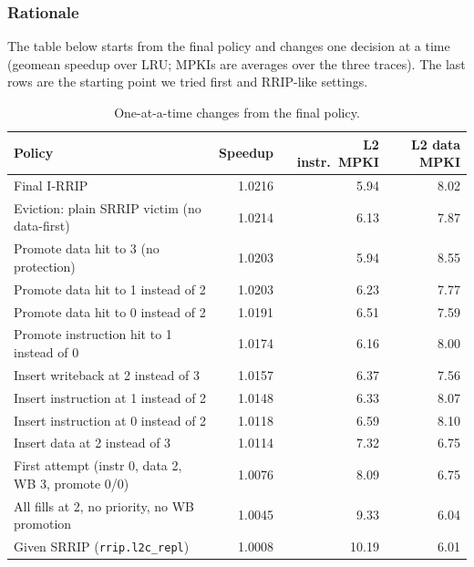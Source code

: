 \documentclass[11pt,a4paper]{article}
\begin{document}
\subsubsection{Rationale}

The table below starts from the final policy and changes one decision at a time (geomean speedup
over LRU; MPKIs are averages over the three traces). The last rows are the starting point we
tried first and RRIP-like settings.

\begin{table}[H]
    \centering
    \begin{tabular}{lrrr}
        \toprule
        Policy & Speedup & L2 instr.\ MPKI & L2 data MPKI \\
        \midrule
        Final I-RRIP                                 & 1.0216 & 5.94  & 8.02 \\
        \midrule
        Eviction: plain SRRIP victim (no data-first) & 1.0214 & 6.13  & 7.87 \\
        Promote data hit to 3 (no protection)        & 1.0203 & 5.94  & 8.55 \\
        Promote data hit to 1 instead of 2           & 1.0203 & 6.23  & 7.77 \\
        Promote data hit to 0 instead of 2           & 1.0191 & 6.51  & 7.59 \\
        Promote instruction hit to 1 instead of 0    & 1.0174 & 6.16  & 8.00 \\
        Insert writeback at 2 instead of 3           & 1.0157 & 6.37  & 7.56 \\
        Insert instruction at 1 instead of 2         & 1.0148 & 6.33  & 8.07 \\
        Insert instruction at 0 instead of 2         & 1.0118 & 6.59  & 8.10 \\
        Insert data at 2 instead of 3                & 1.0114 & 7.32  & 6.75 \\
        \midrule
        First attempt (instr 0, data 2, WB 3, promote 0/0) & 1.0076 & 8.09 & 6.75 \\
        All fills at 2, no priority, no WB promotion  & 1.0045 & 9.33  & 6.04 \\
        Given SRRIP (\texttt{rrip.l2c\_repl})         & 1.0008 & 10.19 & 6.01 \\
        \bottomrule
    \end{tabular}
    \caption{One-at-a-time changes from the final policy.}
    \label{tab:task2a-ablation}
\end{table}
\end{document}

